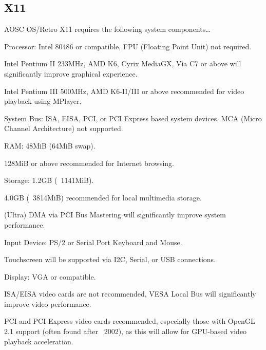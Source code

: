     \subsection{X11}

    AOSC OS/Retro X11 requires the following system components\ldots

    \begin{compactitem}
    \item Processor: Intel 80486 or compatible, FPU (Floating Point Unit) not required.
        \begin{compactitem}
            \item Intel Pentium II 233MHz, AMD K6, Cyrix MediaGX, Via C7 or above will significantly improve graphical experience.
            \item Intel Pentium III 500MHz, AMD K6-II/III or above recommended for video playback using MPlayer.
        \end{compactitem}
    \item System Bus: ISA, EISA, PCI, or PCI Express based system devices. MCA (Micro Channel Architecture) not supported.
    \item RAM: 48MiB (64MiB swap).
        \begin{compactitem}
            \item 128MiB or above recommended for Internet browsing.
        \end{compactitem}
    \item Storage: 1.2GB (~1141MiB).
        \begin{compactitem}
            \item 4.0GB (~3814MiB) recommended for local multimedia storage.
            \item (Ultra) DMA via PCI Bus Mastering will significantly improve system performance.
        \end{compactitem}
    \item Input Device: PS/2 or Serial Port Keyboard and Mouse.
        \begin{compactitem}
            \item Touchscreen will be supported via I2C, Serial, or USB connections.
        \end{compactitem}
    \item Display: VGA or compatible.
        \begin{compactitem}
            \item ISA/EISA video cards are not recommended, VESA Local Bus will significantly improve video performance.
            \item PCI and PCI Express video cards recommended, especially those with OpenGL 2.1 support (often found after ~2002), as this will allow for GPU-based video playback acceleration.
        \end{compactitem}
    \end{compactitem}

